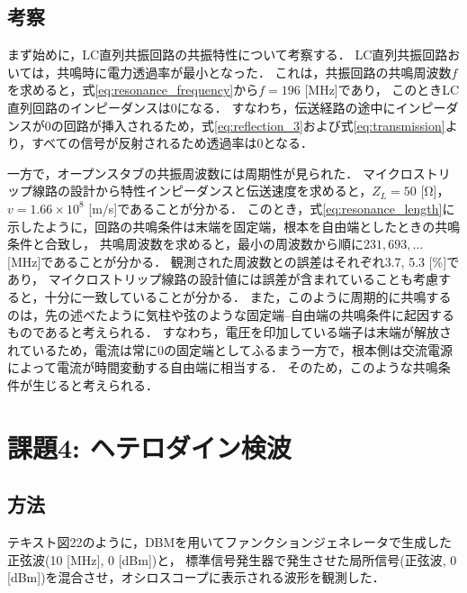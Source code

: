 \documentclass[uplatex,dvipdfmx,a4j,12pt]{jsarticle}
\begin{document}
\subsection{考察}
まず始めに，LC直列共振回路の共振特性について考察する．
LC直列共振回路おいては，共鳴時に電力透過率が最小となった．
これは，共振回路の共鳴周波数$f$を求めると，式\eqref{eq:resonance_frequency}から$f = 196$ [MHz]であり，
このときLC直列回路のインピーダンスは0になる．
すなわち，伝送経路の途中にインピーダンスが0の回路が挿入されるため，式\eqref{eq:reflection_3}および式\eqref{eq:transmission}より，すべての信号が反射されるため透過率は0となる．


一方で，オープンスタブの共振周波数には周期性が見られた．
マイクロストリップ線路の設計から特性インピーダンスと伝送速度を求めると，$Z_L = 50$ [\si{\ohm}]，$v = 1.66\times 10^8$ [m/s]であることが分かる．
このとき，式\eqref{eq:resonance_length}に示したように，回路の共鳴条件は末端を固定端，根本を自由端としたときの共鳴条件と合致し，
共鳴周波数を求めると，最小の周波数から順に$231, 693, \dots$ [MHz]であることが分かる．
観測された周波数との誤差はそれぞれ3.7, 5.3 [\%]であり，
マイクロストリップ線路の設計値には誤差が含まれていることも考慮すると，十分に一致していることが分かる．
また，このように周期的に共鳴するのは，先の述べたように気柱や弦のような固定端--自由端の共鳴条件に起因するものであると考えられる．
すなわち，電圧を印加している端子は末端が解放されているため，電流は常に0の固定端としてふるまう一方で，根本側は交流電源によって電流が時間変動する自由端に相当する．
そのため，このような共鳴条件が生じると考えられる．

\section{課題4: ヘテロダイン検波}
\subsection{方法}
テキスト図22のように，DBMを用いてファンクションジェネレータで生成した正弦波(10 [MHz], 0 [dBm])と，
標準信号発生器で発生させた局所信号(正弦波, 0 [dBm])を混合させ，オシロスコープに表示される波形を観測した．
\end{document}
